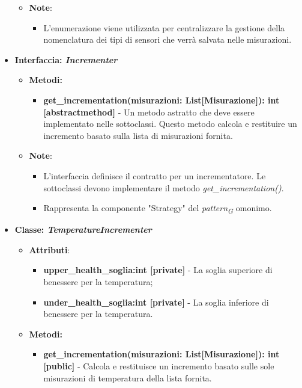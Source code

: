 \begin{itemize}
\begin{itemize}
            \item \textbf{Note}:
            \begin{itemize}
                \item L'enumerazione viene utilizzata per centralizzare la gestione della nomenclatura dei tipi di sensori che verrà salvata nelle misurazioni.
            \end{itemize}
        \end{itemize}
\item \textbf{Interfaccia: \textit{Incrementer}}
    \begin{itemize}
    \item \textbf{Metodi: }
    \begin{itemize}
        \item \textbf{get\_incrementation(misurazioni: List[Misurazione]): int [abstractmethod]} - Un metodo astratto che deve essere implementato nelle sottoclassi. Questo metodo calcola e restituire un incremento basato sulla lista di misurazioni fornita.
    \end{itemize}
    \item\textbf{Note}:
        \begin{itemize}
            \item L'interfaccia definisce il contratto per un incrementatore. Le sottoclassi devono implementare il metodo \textit{get\_incrementation()}.
            \item Rappresenta la componente "Strategy" del \textit{pattern}\textsubscript{\textit{G}} omonimo.
        \end{itemize}
    \end{itemize}
    \item \textbf{Classe: \textit{TemperatureIncrementer}}
    \begin{itemize}
    \item \textbf{Attributi}:
        \begin{itemize}
        \item \textbf{upper\_health\_soglia:int [private]} - La soglia superiore di benessere per la temperatura;
        \item \textbf{under\_health\_soglia:int [private]} - La soglia inferiore di benessere per la temperatura.
    \end{itemize}
    \item \textbf{Metodi: }
    \begin{itemize}
        \item \textbf{get\_incrementation(misurazioni: List[Misurazione]): int [public]} - Calcola e restituisce un incremento basato sulle sole misurazioni di temperatura della lista fornita.

\end{itemize}
\end{itemize}
\end{itemize}
